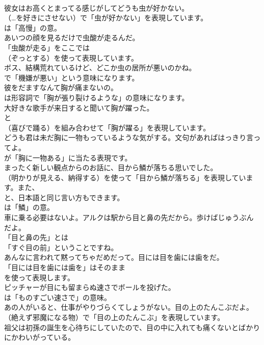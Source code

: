 \documentclass[8pt]{extreport}
\begin{document}
\begin{CJK}{UTF8}{min}
\\	彼女はお高くとまってる感じがしてどうも虫が好かない。 
\\	（…を好きにさせない）で「虫が好かない」を表現しています。
\\	は「高慢」の意。	
\\	あいつの顔を見るだけで虫酸が走るんだ。 
\\	「虫酸が走る」をここでは
\\	（ぞっとする）を使って表現しています。	
\\	ボス、結構荒れているけど、どこか虫の居所が悪いのかね。 
\\	で「機嫌が悪い」という意味になります。	
\\	彼をだますなんて胸が痛まないの。 
\\	は形容詞で「胸が張り裂けるような」の意味になります。	
\\	大好きな歌手が来日すると聞いて胸が躍った。 
\\	と 
\\	（喜びで踊る）を組み合わせて「胸が躍る」を表現しています。	
\\	どうも君は未だ胸に一物もっているような気がする。文句があればはっきり言ってよ。 
\\	が「胸に一物ある」に当たる表現です。	
\\	まったく新しい観点からのお話に、目から鱗が落ちる思いでした。 
\\	（明かりが見える、納得する）を使って「目から鱗が落ちる」を表現しています。また、
\\	と、日本語と同じ言い方もできます。
\\	は「鱗」の意。	
\\	車に乗る必要はないよ。アルクは駅から目と鼻の先だから。歩けばじゅうぶん だよ。 
\\	「目と鼻の先」とは
\\	「すぐ目の前」ということですね。	
\\	あんなに言われて黙ってちゃだめだって。目には目を歯には歯をだ。 
\\	「目には目を歯には歯を」はそのまま
\\	を使って表現します。	
\\	ピッチャーが目にも留まらぬ速さでボールを投げた。 
\\	は「ものすごい速さで」の意味。	
\\	あの人がいると、仕事がやりづらくてしょうがない。目の上のたんこぶだよ。 
\\	（絶えず邪魔になる物）で「目の上のたんこぶ」を表現しています。	
\\	祖父は初孫の誕生を心待ちにしていたので、目の中に入れても痛くないとばかりにかわいがっている。 

\end{CJK}
\end{document}
